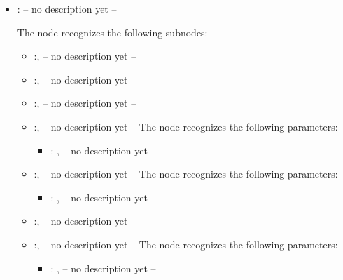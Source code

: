\begin{itemize}
\begin{itemize}
\begin{itemize}
            \item {}:
              -- no description yet --

              The  node recognizes the following subnodes:
              \begin{itemize}
                \item {}:, 
                  -- no description yet --

                \item {}:, 
                  -- no description yet --

                \item {}:, 
                  -- no description yet --

                \item {}:, 
                  -- no description yet --
                  The  node recognizes the following parameters:
                    \begin{itemize}
                      \item {}: , 
                        -- no description yet --
                  \end{itemize}

                \item {}:, 
                  -- no description yet --
                  The  node recognizes the following parameters:
                    \begin{itemize}
                      \item {}: , 
                        -- no description yet --
                  \end{itemize}

                \item {}:, 
                  -- no description yet --

                \item {}:, 
                  -- no description yet --
                  The  node recognizes the following parameters:
                    \begin{itemize}
                      \item {}: , 
                        -- no description yet --
                  \end{itemize}
              \end{itemize}


\end{itemize}
\end{itemize}
\end{itemize}
